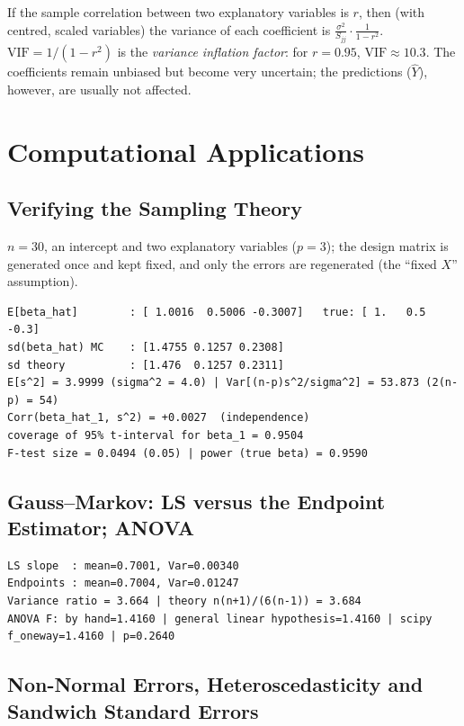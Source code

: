 \documentclass[main.tex]{subfiles}
\begin{document}
\begin{example}[Multicollinearity]
If the sample correlation between two explanatory variables is $r$, then (with centred, scaled variables) the variance of each coefficient is $\frac{\sigma^2}{S_{jj}}\cdot\frac{1}{1-r^2}$. $\mathrm{VIF}=1/(1-r^2)$ is the \emph{variance inflation factor}: for $r=0.95$, $\mathrm{VIF}\approx10.3$. The coefficients remain unbiased but become very uncertain; the predictions ($\hat Y$), however, are usually not affected.
\end{example}

\section{Computational Applications}

\subsection{Verifying the Sampling Theory}
$n=30$, an intercept and two explanatory variables ($p=3$); the design matrix is generated once and kept fixed, and only the errors are regenerated (the ``fixed $X$'' assumption).

\begin{lstlisting}[style=output]
E[beta_hat]        : [ 1.0016  0.5006 -0.3007]   true: [ 1.   0.5 -0.3]
sd(beta_hat) MC    : [1.4755 0.1257 0.2308]
sd theory          : [1.476  0.1257 0.2311]
E[s^2] = 3.9999 (sigma^2 = 4.0) | Var[(n-p)s^2/sigma^2] = 53.873 (2(n-p) = 54)
Corr(beta_hat_1, s^2) = +0.0027  (independence)
coverage of 95% t-interval for beta_1 = 0.9504
F-test size = 0.0494 (0.05) | power (true beta) = 0.9590
\end{lstlisting}

\subsection{Gauss--Markov: LS versus the Endpoint Estimator; ANOVA}

\begin{lstlisting}[style=output]
LS slope  : mean=0.7001, Var=0.00340
Endpoints : mean=0.7004, Var=0.01247
Variance ratio = 3.664 | theory n(n+1)/(6(n-1)) = 3.684
ANOVA F: by hand=1.4160 | general linear hypothesis=1.4160 | scipy f_oneway=1.4160 | p=0.2640
\end{lstlisting}

\subsection{Non-Normal Errors, Heteroscedasticity and Sandwich Standard Errors}
\end{document}
